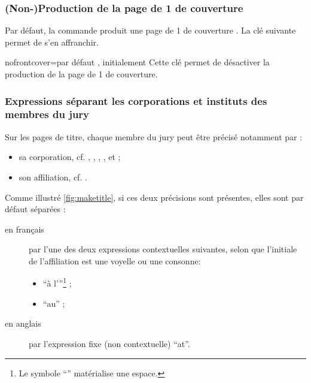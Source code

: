 \subsubsection{(Non-)Production de la page de 1\iere{} de couverture}\label{sec:non-production-de}

Par défaut, la commande  produit une page de 1\iere{} de
couverture . La clé
 suivante permet de s'en affranchir.

\begin{docKey}{nofrontcover}{=\textbar{}}{par défaut
    , initialement }
  Cette clé permet de désactiver la production de la page de 1\iere{} de
  couverture.
\end{docKey}

\subsubsection{Expressions séparant les corporations et instituts des membres du jury}
\label{sec:expr-separ-les}

Sur les pages de titre, chaque membre du jury peut être précisé notamment par :
\begin{itemize}
\item sa corporation, cf. , , ,
  ,  et
   ;
\item son affiliation, cf. .
\end{itemize}
Comme illustré \vref{fig:maketitle}, si ces deux précisions sont présentes,
elles sont par défaut séparées :
\begin{description}
\item[en français] par l'une des deux expressions contextuelles suivantes,
  selon que l'initiale de l'affiliation est une voyelle ou une consonne:
  \begin{itemize}
  \item \enquote{\textvisiblespace{}à l'}\footnote{Le symbole
      \enquote{\textvisiblespace{}} matérialise une espace.} ;
  \item \enquote{\textvisiblespace{}au\textvisiblespace{}} ;
  \end{itemize}
\item[en anglais] par l'expression fixe (non contextuelle)
  \enquote{\textvisiblespace{}at\textvisiblespace{}}.
\end{description}

